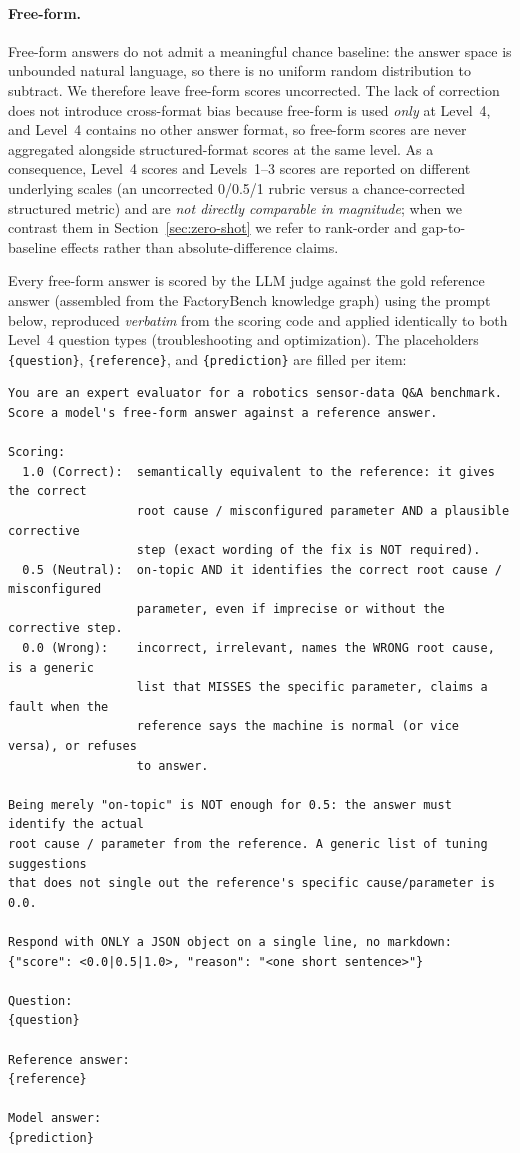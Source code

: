 \paragraph{Free-form.} Free-form answers do not admit a meaningful chance baseline: the answer space is unbounded natural language, so there is no uniform random distribution to subtract. We therefore leave free-form scores uncorrected. The lack of correction does not introduce cross-format bias because free-form is used \emph{only} at Level~4, and Level~4 contains no other answer format, so free-form scores are never aggregated alongside structured-format scores at the same level. As a consequence, Level~4 scores and Levels~1--3 scores are reported on different underlying scales (an uncorrected 0/0.5/1 rubric versus a chance-corrected structured metric) and are \emph{not directly comparable in magnitude}; when we contrast them in Section~\ref{sec:zero-shot} we refer to rank-order and gap-to-baseline effects rather than absolute-difference claims.

Every free-form answer is scored by the LLM judge against the gold reference answer (assembled from the FactoryBench knowledge graph) using the prompt below, reproduced \emph{verbatim} from the scoring code and applied identically to both Level~4 question types (troubleshooting and optimization). The placeholders \texttt{\{question\}}, \texttt{\{reference\}}, and \texttt{\{prediction\}} are filled per item:

{\footnotesize\begin{verbatim}
You are an expert evaluator for a robotics sensor-data Q&A benchmark.
Score a model's free-form answer against a reference answer.

Scoring:
  1.0 (Correct):  semantically equivalent to the reference: it gives the correct
                  root cause / misconfigured parameter AND a plausible corrective
                  step (exact wording of the fix is NOT required).
  0.5 (Neutral):  on-topic AND it identifies the correct root cause / misconfigured
                  parameter, even if imprecise or without the corrective step.
  0.0 (Wrong):    incorrect, irrelevant, names the WRONG root cause, is a generic
                  list that MISSES the specific parameter, claims a fault when the
                  reference says the machine is normal (or vice versa), or refuses
                  to answer.

Being merely "on-topic" is NOT enough for 0.5: the answer must identify the actual
root cause / parameter from the reference. A generic list of tuning suggestions
that does not single out the reference's specific cause/parameter is 0.0.

Respond with ONLY a JSON object on a single line, no markdown:
{"score": <0.0|0.5|1.0>, "reason": "<one short sentence>"}

Question:
{question}

Reference answer:
{reference}

Model answer:
{prediction}
\end{verbatim}}

